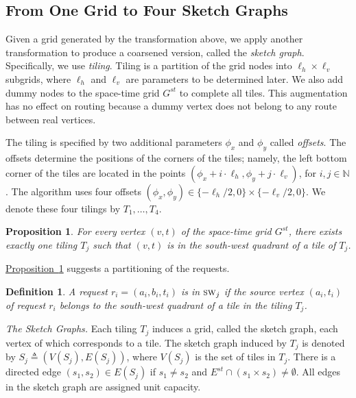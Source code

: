 \documentclass[11pt]{article}
\newtheorem{proposition}[theorem]{Proposition}
\newtheorem{definition}[theorem]{Definition}
\newcommand{\namedref}[2]{\hyperref[#2]{#1~\ref*{#2}}}
\newcommand{\propref}[1]{\namedref{Proposition}{#1}}
\newenvironment{proof sketch}[1]{\noindent {\emph{Proof sketch of #1:}}}{\hfill \qed}
\def\DEF{\triangleq}
\newcommand{\sw}{\text{\sc{sw}\xspace}\xspace}
\newcommand{\Hl}{\ell_h}
\newcommand{\vl}{\ell_v}
\begin{document}
\subsection{From One Grid to Four Sketch Graphs}\label{sec:sketch graph}
Given a grid generated by the transformation above, we apply another
transformation to produce a coarsened version, called the \emph{sketch
  graph}. Specifically, we use
\emph{tiling}. Tiling is a partition of the grid nodes into
 $\Hl\times \vl$ subgrids, where $\Hl$ and  $\vl$ are parameters to
 be determined later.  We also add dummy nodes to the space-time grid
$G^{st}$ to complete all tiles.  This augmentation has no effect on
routing because a dummy vertex
does not belong to any route between real vertices.

The tiling is specified by two additional parameters $\phi_{x}$ and $\phi_{y}$ called
\emph{offsets}.  The offsets determine the positions of the corners of the tiles;
namely, the left bottom corner of the tiles are located in the points
$(\phi_{x}+i\cdot\Hl ,\phi_{y}+j\cdot\vl)$, for $i,j\in \mathbb{N}$. The algorithm
uses four offsets $(\phi_{x}, \phi_{y})\in \{-\Hl/2,0\}\times \{-\vl/2,0\}$.  We
denote these four tilings by $T_1,\ldots,T_4$.

\begin{proposition}\label{prop:sw}
  For every vertex $(v,t)$ of the space-time grid $G^{st}$, there exists exactly one
  tiling $T_j$ such that $(v,t)$ is in the south-west quadrant of a tile of $T_j$.
\end{proposition}
\noindent \propref{prop:sw} suggests a partitioning of the requests.
\begin{definition}
  A request $r_i=(a_i,b_i,t_i)$ is in $\sw_j$ if the source vertex $(a_i,t_i)$ of request $r_i$
  belongs to the south-west quadrant of a tile in the tiling $T_j$.
\end{definition}


\emph{The Sketch Graphs.}  Each tiling $T_j$ induces a grid, called the sketch graph,
each vertex of which corresponds to a tile. The sketch graph induced by $T_j$ is
denoted by $S_j\DEF(V(S_j),E(S_j))$, where $V(S_j)$ is the set of tiles in $T_j$.
There is a directed edge $(s_1,s_2)\in E(S_j)$ if $s_1\neq s_2$ and $E^{st}\cap (s_1\times s_2)\neq
\emptyset$.  All edges in the sketch graph are assigned unit capacity.
\end{document}
